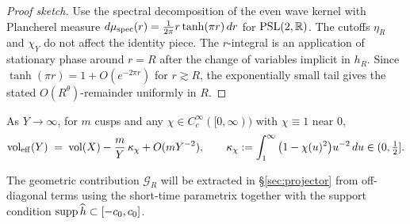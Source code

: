 \begin{proof}[Proof sketch]
Use the spectral decomposition of the even wave kernel with Plancherel measure
$d\mu_{\rm spec}(r)=\frac{1}{2\pi}r\tanh(\pi r)\,dr$ for $\mathrm{PSL}(2,\mathbb{R})$. The
cutoffs $\eta_R$ and $\chi_Y$ do not affect the identity piece. The $r$-integral
is an application of stationary phase around $r=R$ after the change of variables
implicit in $h_R$. Since $\tanh(\pi r)=1+O(e^{-2\pi r})$ for $r\gtrsim R$, the
exponentially small tail gives the stated $O(R^\theta)$-remainder uniformly in $R$.
\end{proof}

\begin{remark}\label{rem:veff}
As $Y\to\infty$, for $m$ cusps and any $\chi\in C_c^\infty([0,\infty))$ with
$\chi\equiv1$ near $0$,
\[
  \operatorname{vol}_{\mathrm{eff}}(Y)
  \;=\; \operatorname{vol}(X)-\frac{m}{Y}\,\kappa_\chi+O(mY^{-2}),
  \qquad
  \kappa_\chi:=\int_1^\infty \big(1-\chi(u)^2\big)u^{-2}\,du \in (0,\tfrac12].
\]
\end{remark}

The geometric contribution $\mathcal{G}_R$ will be extracted in
\S\ref{sec:projector} from off-diagonal terms using the short-time parametrix
together with the support condition $\operatorname{supp} \widehat{h}\subset[-c_0,c_0]$.
